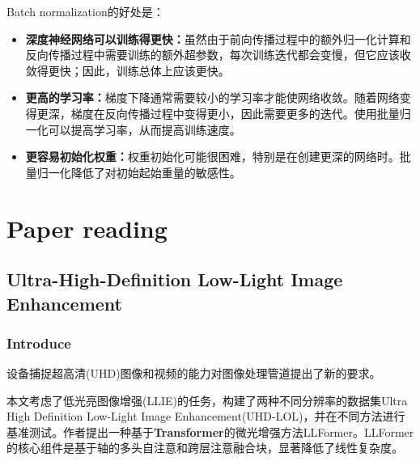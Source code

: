 \documentclass[letterpaper,10pt]{article}
\begin{document}
	Batch normalization的好处是：
	
	\begin{itemize}
		\item {}
		
		\textbf{深度神经网络可以训练得更快：}虽然由于前向传播过程中的额外归一化计算和反向传播过程中需要训练的额外超参数，每次训练迭代都会变慢，但它应该收敛得更快；因此，训练总体上应该更快。	
		
		\item {}
		\textbf{更高的学习率：}梯度下降通常需要较小的学习率才能使网络收敛。随着网络变得更深，梯度在反向传播过程中变得更小，因此需要更多的迭代。使用批量归一化可以提高学习率，从而提高训练速度。
		
		\item {}
		\textbf{更容易初始化权重：}权重初始化可能很困难，特别是在创建更深的网络时。批量归一化降低了对初始起始重量的敏感性。
		
	\end{itemize}
	
	
	\section{Paper reading}
	
	\subsection{Ultra-High-Definition Low-Light Image Enhancement}
	
	\subsubsection{Introduce}
	
	设备捕捉超高清(UHD)图像和视频的能力对图像处理管道提出了新的要求。
	
	本文考虑了低光亮图像增强(LLIE)的任务，构建了两种不同分辨率的数据集Ultra High Definition Low-Light Image Enhancement(UHD-LOL)，并在不同方法进行基准测试。作者提出一种基于\textbf{Transformer}的微光增强方法LLFormer。LLFormer的核心组件是基于轴的多头自注意和跨层注意融合块，显著降低了线性复杂度。
	
\end{document}
